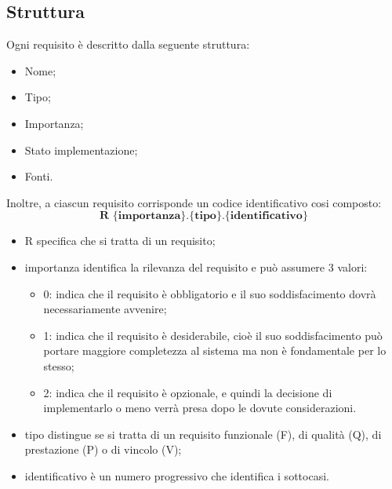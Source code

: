 \subsection{Struttura}
Ogni requisito è descritto dalla seguente struttura:
\begin{itemize}
	\item Nome;
	\item Tipo;
	\item Importanza;
	\item Stato implementazione;
	\item Fonti.
\end{itemize}

Inoltre, a ciascun requisito corrisponde un codice identificativo cosi composto:
$$ \textbf{R \{importanza\}.\{tipo\}.\{identificativo\}  } $$
\begin{itemize}
	\item R specifica che si tratta di un requisito;
	\item importanza identifica la rilevanza del requisito e può assumere 3 valori:
	\begin{itemize}
		\item 0: indica che il requisito è obbligatorio e il suo soddisfacimento dovrà necessariamente avvenire;
		\item 1: indica che il requisito è desiderabile, cioè il suo soddisfacimento può portare maggiore completezza al sistema ma non è fondamentale per lo stesso;
		\item 2: indica che il requisito è opzionale, e quindi la decisione di implementarlo o meno verrà presa dopo le dovute considerazioni.
	\end{itemize}
	\item tipo distingue se si tratta di un requisito funzionale (F), di qualità (Q), di prestazione (P) o di vincolo (V);
	\item identificativo è un numero progressivo che identifica i sottocasi.
\end{itemize}
